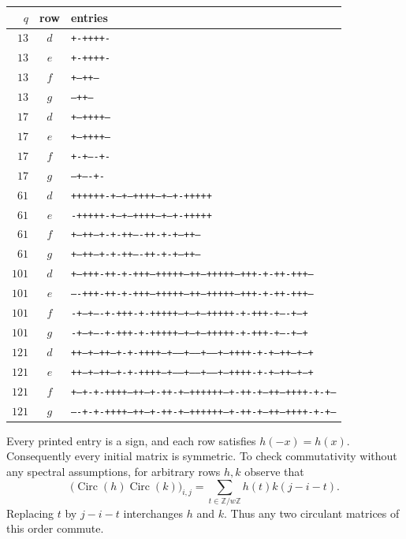 \documentclass[10pt]{article}
\begin{document}
\begin{center}\scriptsize
\begin{tabular}{rcl}
$q$&row&entries\\\hline
$13$&$d$&\texttt{+-++++-}\\
$13$&$e$&\texttt{+-++++-}\\
$13$&$f$&\texttt{+--++--}\\
$13$&$g$&\texttt{---++--}\\
\hline
$17$&$d$&\texttt{+--++++--}\\
$17$&$e$&\texttt{+--++++--}\\
$17$&$f$&\texttt{+-+----+-}\\
$17$&$g$&\texttt{--+----+-}\\
\hline
$61$&$d$&\texttt{++++++-+--+---++++---+--+-+++++}\\
$61$&$e$&\texttt{-+++++-+--+---++++---+--+-+++++}\\
$61$&$f$&\texttt{+--++---+-+-++----++-+-+---++--}\\
$61$&$g$&\texttt{+--++---+-+-++----++-+-+---++--}\\
\hline
$101$&$d$&\texttt{+---+++-++-+-+++--+++++--++--+++++--+++-+-++-+++---}\\
$101$&$e$&\texttt{----+++-++-+-+++--+++++--++--+++++--+++-+-++-+++---}\\
$101$&$f$&\texttt{-+--+----+-+++-+-+++++--+--+--+++++-+-+++-+----+--+}\\
$101$&$g$&\texttt{-+--+----+-+++-+-+++++--+--+--+++++-+-+++-+----+--+}\\
\hline
$121$&$d$&\texttt{++--+--++--+-+-++++--+-----+------+-----+--++++-+-+--++--+--+}\\
$121$&$e$&\texttt{++--+--++--+-+-++++--+-----+------+-----+--++++-+-+--++--+--+}\\
$121$&$f$&\texttt{+---+-+-++++---++--+-++-+---++++++---+-++-+--++---++++-+-+---}\\
$121$&$g$&\texttt{----+-+-++++---++--+-++-+---++++++---+-++-+--++---++++-+-+---}\\
\hline
\end{tabular}
\end{center}

Every printed entry is a sign, and each row satisfies $h(-x)=h(x)$.
Consequently every initial matrix is symmetric. To check commutativity
without any spectral assumptions, for arbitrary rows $h,k$ observe that
\[
 \bigl(\operatorname{Circ}(h)\operatorname{Circ}(k)\bigr)_{i,j}
 =\sum_{t\in\mathbb Z/w\mathbb Z}h(t)k(j-i-t).
\]
Replacing $t$ by $j-i-t$ interchanges $h$ and $k$. Thus any two circulant
matrices of this order commute.
\end{document}
